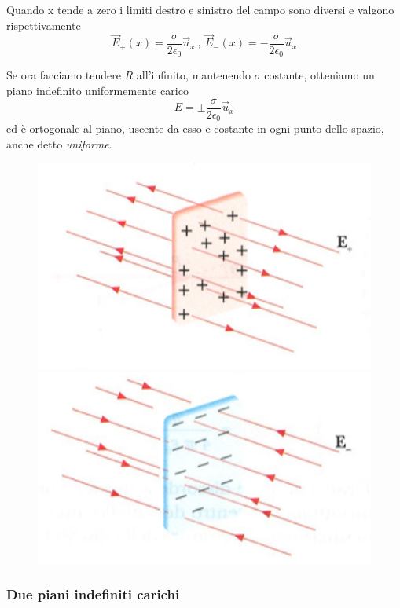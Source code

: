 \documentclass[class=book, crop=false, oneside, 12pt]{standalone}
\begin{document}
Quando x tende a zero i limiti destro e sinistro del campo sono diversi e valgono rispettivamente
\begin{equation*}
    \overrightarrow{E}_{+} (x) = \frac{\sigma}{2 \epsilon_0} \overrightarrow{u}_x \ , \ \overrightarrow{E}_{-} (x) = - \frac{\sigma}{2 \epsilon_0} \overrightarrow{u}_x 
\end{equation*}

Se ora facciamo tendere \(R\) all'infinito, mantenendo \(\sigma\) costante, otteniamo un piano indefinito uniformemente carico
\begin{equation*}
    E = \pm \frac{\sigma}{2 \epsilon_0} \overrightarrow{u}_x
\end{equation*}
ed è ortogonale al piano, uscente da esso e costante in ogni punto dello spazio, anche detto \emph{uniforme}.

\begin{figure}[h]
    \includegraphics[scale=0.4]{piano_carico1.png}
    \includegraphics[scale=0.4]{piano_carico2.png}
    \centering
    \caption{}
\end{figure}

\subsubsection*{Due piani indefiniti carichi}
\end{document}

